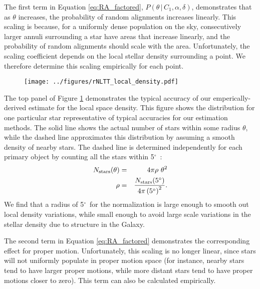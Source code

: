 \documentclass[usenatbib]{mnras}
\newcommand{\given}{\,|\,}
\newcommand{\degree}{\ifmmode {^\circ}\else$^\circ$\ \fi}
\begin{document}
The first term in Equation \ref{eq:RA_factored}, $P(\theta \given C_1, \alpha, \delta)$, demonstrates that as $\theta$ increases, the probability of random alignments increases linearly. This scaling is because, for a uniformly dense population on the sky, consecutively larger annuli surrounding a star have areas that increase linearly, and the probability of random alignments should scale with the area. Unfortunately, the scaling coefficient depends on the local stellar density surrounding a point. We therefore determine this scaling empirically for each point. 

\begin{figure}
\begin{center}
\texttt{[image: ../figures/rNLTT\_local\_density.pdf]}
\caption{}
\label{fig:rNLTT_density}
\end{center}
\end{figure}

The top panel of Figure \ref{fig:rNLTT_density} demonstrates the typical accuracy of our emperically-derived estimate for the local space density. This figure shows the distribution for one particular star representative of typical accuracies for our estimation methods. The solid line shows the actual number of stars within some radius $\theta$, while the dashed line approximates this distribution by assuming a smooth density of nearby stars. The dashed line is determined independently for each primary object by counting all the stars within 5\degree:
\begin{eqnarray}
N_{\rm stars}(\theta) &=& 4 \pi \rho\ \theta^2 \nonumber \\
\rho &=& \frac{N_{\rm stars}(5\degree) }{4 \pi \left(5\degree\right)^2}.
\end{eqnarray}
We find that a radius of 5\degree for the normalization is large enough to smooth out local density variations, while small enough to avoid large scale variations in the stellar density due to structure in the Galaxy.


The second term in Equation \ref{eq:RA_factored} demonstrates the corresponding effect for proper motion. Unfortunately, this scaling is no longer linear, since stars will not uniformly populate in proper motion space (for instance, nearby stars tend to have larger proper motions, while more distant stars tend to have proper motions closer to zero). This term can also be calculated empirically. 
\end{document}
